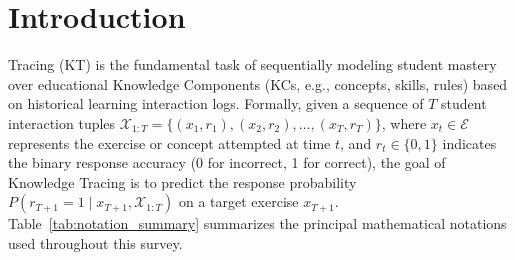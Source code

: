 \documentclass[10pt,journal,compsoc]{IEEEtran}
\begin{document}
\maketitle
\IEEEdisplaynontitleabstractindextext
\IEEEpeerreviewmaketitle

\section{Introduction}
 Tracing (KT) is the fundamental task of sequentially modeling student mastery over educational Knowledge Components (KCs, e.g., concepts, skills, rules) based on historical learning interaction logs. Formally, given a sequence of $T$ student interaction tuples $\mathcal{X}_{1:T} = \{(x_1, r_1), (x_2, r_2), \dots, (x_T, r_T)\}$, where $x_t \in \mathcal{E}$ represents the exercise or concept attempted at time $t$, and $r_t \in \{0, 1\}$ indicates the binary response accuracy (0 for incorrect, 1 for correct), the goal of Knowledge Tracing is to predict the response probability $P(r_{T+1} = 1 \mid x_{T+1}, \mathcal{X}_{1:T})$ on a target exercise $x_{T+1}$. Table~\ref{tab:notation_summary} summarizes the principal mathematical notations used throughout this survey.

\begin{table}[t]
\caption{Summary of Key Mathematical Notations}
\label{tab:notation_summary}
\centering
{}
\end{table}
\end{document}
